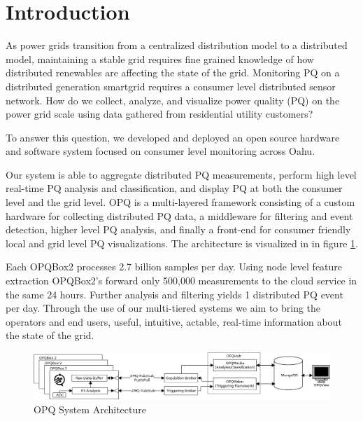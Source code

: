 \documentclass[a4paper, conference]{IEEEtran}
\begin{document}
\section{Introduction}
As power grids transition from a centralized distribution model to a distributed model, maintaining a stable grid requires fine grained knowledge of how distributed renewables are affecting the state of the grid. Monitoring PQ on a distributed generation smartgrid requires a consumer level distributed sensor network. How do we collect, analyze, and visualize power quality (PQ) on the power grid scale using data gathered from residential utility customers? 

To answer this question, we developed and deployed an open source hardware and software system focused on consumer level monitoring across Oahu. 

Our system is able to aggregate distributed PQ measurements, perform high level real-time PQ analysis and classification, and display PQ at both the consumer level and the grid level. OPQ is a multi-layered framework consisting of a custom hardware for collecting distributed PQ data, a middleware for filtering and event detection, higher level PQ analysis, and finally a front-end for consumer friendly local and grid level PQ visualizations. The architecture is visualized in in figure \ref{fig:system-architecture}.


Each OPQBox2 processes 2.7 billion samples per day. Using node level feature extraction OPQBox2's forward only 500,000 measurements to the cloud service in the same 24 hours. Further analysis and filtering yields 1 distributed PQ event per day.  Through the use of our multi-tiered systems we aim to bring the operators and end users, useful, intuitive, actable, real-time information about the state of the grid.


\begin{figure}[htb!]\label{fig:system-architecture}
    \centering
    \includegraphics[width=\linewidth]{img/system-diagram}
    \caption{OPQ System Architecture}
\end{figure}
\end{document}
